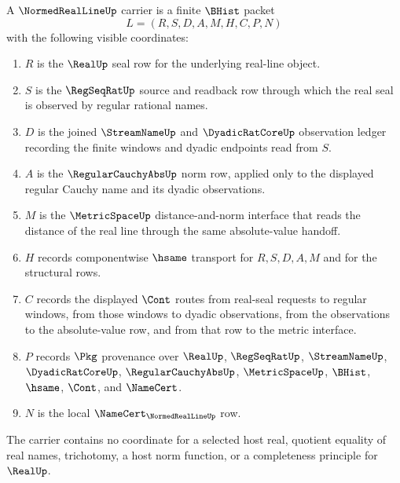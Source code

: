 \begin{definition}
\label{def:normed-real-line-carrier}
A $\NormedRealLineUp$ carrier is a finite $\BHist$ packet
$$
L=(R,S,D,A,M,H,C,P,N)
$$
with the following visible coordinates:
\begin{enumerate}
\item $R$ is the $\RealUp$ seal row for the underlying real-line object.
\item $S$ is the $\RegSeqRatUp$ source and readback row through which the real seal is observed by regular rational names.
\item $D$ is the joined $\StreamNameUp$ and $\DyadicRatCoreUp$ observation ledger recording the finite windows and dyadic endpoints read from $S$.
\item $A$ is the $\RegularCauchyAbsUp$ norm row, applied only to the displayed regular Cauchy name and its dyadic observations.
\item $M$ is the $\MetricSpaceUp$ distance-and-norm interface that reads the distance of the real line through the same absolute-value handoff.
\item $H$ records componentwise $\hsame$ transport for $R,S,D,A,M$ and for the structural rows.
\item $C$ records the displayed $\Cont$ routes from real-seal requests to regular windows, from those windows to dyadic observations, from the observations to the absolute-value row, and from that row to the metric interface.
\item $P$ records $\Pkg$ provenance over $\RealUp$, $\RegSeqRatUp$, $\StreamNameUp$, $\DyadicRatCoreUp$, $\RegularCauchyAbsUp$, $\MetricSpaceUp$, $\BHist$, $\hsame$, $\Cont$, and $\NameCert$.
\item $N$ is the local $\NameCert_{\NormedRealLineUp}$ row.
\end{enumerate}
The carrier contains no coordinate for a selected host real, quotient equality of real names, trichotomy, a host norm function, or a completeness principle for $\RealUp$.
\end{definition}

